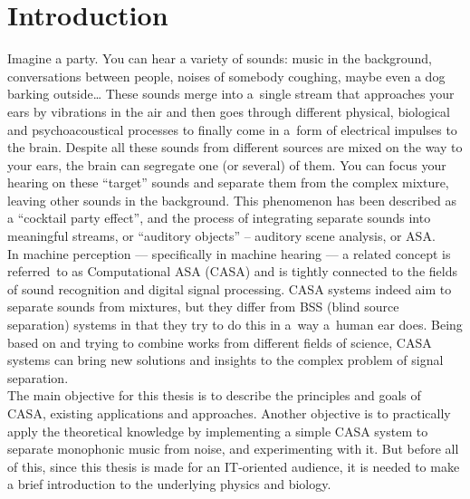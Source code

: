 \chapter{Introduction}\label{chapter:introduction}

Imagine a party. You can hear a variety of sounds: music in the background, conversations between people, noises of somebody coughing, maybe even a dog barking outside\dots{} These sounds merge into a~single stream that approaches your ears by vibrations in the air and then goes through different physical, biological and psychoacoustical processes to finally come in a~form of electrical impulses to the brain. Despite all these sounds from different sources are mixed on the way to your ears, the brain can segregate one (or several) of them. You can focus your hearing on these “target” sounds and separate them from the complex mixture, leaving other sounds in the background. This phenomenon has been described as a “cocktail party effect”, and the process of integrating separate sounds into meaningful streams, or “auditory objects” -- auditory scene analysis, or ASA.\\

In machine perception --- specifically in machine hearing --- a related concept is referred~to as Computational ASA (CASA) and is tightly connected to the fields of sound recognition and digital signal processing. CASA systems indeed aim to separate sounds from mixtures, but they differ from BSS (blind source separation) systems in that they try to do this in a~way a~human ear does. Being based on and trying to combine works from different fields of science, CASA systems can bring new solutions and insights to the complex problem of signal separation.\\

The main objective for this thesis is to describe the principles and goals of CASA, existing applications and approaches. Another objective is to practically apply the theoretical knowledge by implementing a simple CASA system to separate monophonic music from noise, and experimenting with it. But before all of this, since this thesis is made for an IT-oriented audience, it is needed to make a brief introduction to the underlying physics and biology.\\

